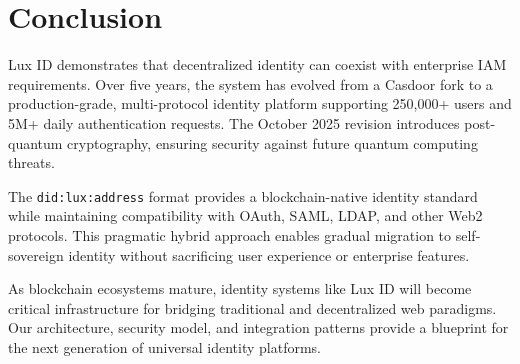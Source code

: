 \section{Conclusion}


Lux ID demonstrates that decentralized identity can coexist with enterprise IAM requirements. Over five years, the system has evolved from a Casdoor fork to a production-grade, multi-protocol identity platform supporting 250,000+ users and 5M+ daily authentication requests. The October 2025 revision introduces post-quantum cryptography, ensuring security against future quantum computing threats.

The \texttt{did:lux:address} format provides a blockchain-native identity standard while maintaining compatibility with OAuth, SAML, LDAP, and other Web2 protocols. This pragmatic hybrid approach enables gradual migration to self-sovereign identity without sacrificing user experience or enterprise features.

As blockchain ecosystems mature, identity systems like Lux ID will become critical infrastructure for bridging traditional and decentralized web paradigms. Our architecture, security model, and integration patterns provide a blueprint for the next generation of universal identity platforms.

